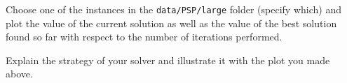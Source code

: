 \documentclass[12pt]{report}
\newcommand{\answerbox}[2]{\hfill\break\\
        \framebox[\linewidth]{\parbox[c][#1][c]{\dimexpr\linewidth-2\fboxsep-2\fboxrule}{#2}}
}
\begin{document}
\begin{Exercise}[title={Analyzing the behavior of your local search solver}]

\Question Choose one of the instances in the \texttt{data/PSP/large} folder (specify which) and plot the value of the current solution as well as the value of the best solution found so far with respect to the number of iterations performed.
\answerbox{8cm}{
}

\Question Explain the strategy of your solver and illustrate it with the plot you made above.
\answerbox{5cm}{
}

\end{Exercise}
\end{document}
